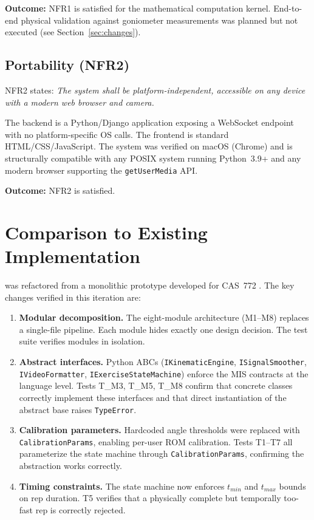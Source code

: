 \documentclass[12pt, titlepage]{article}
\begin{document}
\textbf{Outcome:} NFR1 is satisfied for the mathematical computation kernel.
End-to-end physical validation against goniometer measurements was planned but
not executed (see Section~\ref{sec:changes}).

\subsection{Portability (NFR2)}

NFR2 states: \textit{The system shall be platform-independent, accessible on
any device with a modern web browser and camera.}

The backend is a Python/Django application exposing a WebSocket endpoint with
no platform-specific OS calls. The frontend is standard HTML/CSS/JavaScript.
The system was verified on macOS (Chrome) and is structurally compatible with
any POSIX system running Python~3.9+ and any modern browser supporting the
\texttt{getUserMedia} API.

\textbf{Outcome:} NFR2 is satisfied.

\section{Comparison to Existing Implementation}
\label{sec:comp}

\progname{} was refactored from a monolithic prototype developed for
CAS~772 \citep{SRS}. The key changes verified in this iteration are:

\begin{enumerate}

  \item \textbf{Modular decomposition.} The eight-module architecture (M1--M8)
    replaces a single-file pipeline. Each module hides exactly one design
    decision. The test suite verifies modules in isolation.

  \item \textbf{Abstract interfaces.} Python ABCs (\texttt{IKinematicEngine},
    \texttt{ISignalSmoother}, \texttt{IVideoFormatter},
    \texttt{IExerciseStateMachine}) enforce the MIS contracts at the language
    level. Tests T\_M3, T\_M5, T\_M8 confirm that concrete classes correctly
    implement these interfaces and that direct instantiation of the abstract
    base raises \texttt{TypeError}.

  \item \textbf{Calibration parameters.} Hardcoded angle thresholds were
    replaced with \texttt{CalibrationParams}, enabling per-user ROM calibration.
    Tests T1--T7 all parameterize the state machine through
    \texttt{CalibrationParams}, confirming the abstraction works correctly.

  \item \textbf{Timing constraints.} The state machine now enforces
    $t_{min}$ and $t_{max}$ bounds on rep duration. T5 verifies that a
    physically complete but temporally too-fast rep is correctly rejected.

\end{enumerate}
\end{document}
